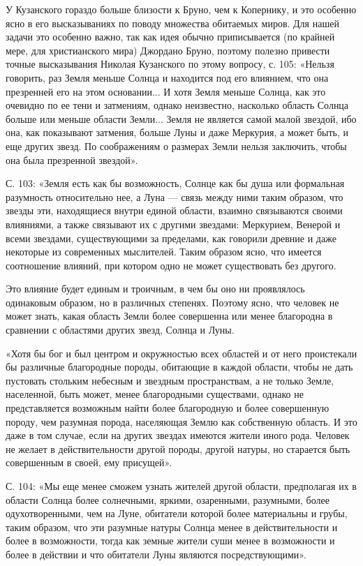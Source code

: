 У Кузанского гораздо  больше близости к Бруно, чем к  Копернику, и это
особенно  ясно  в  его  высказываниях по  поводу  множества  обитаемых
миров.  Для нашей  задачи  это  особенно важно,  так  как идея  обычно
приписывается  (по  крайней  мере, для  христианского  мира)  Джордано
Бруно, поэтому полезно привести точные высказывания Николая Кузанского
по этому  вопросу, с. 105:  «Нельзя говорить, раз Земля  меньше Солнца
и  находится  под  его  влиянием,  что  она  презренней  его  на  этом
основании... И хотя Земля меньше Солнца, как это очевидно по ее тени и
затмениям,  однако неизвестно,  насколько  область  Солнца больше  или
меньше области  Земли... Земля  не является  самой малой  звездой, ибо
она, как  показывают затмения,  больше Луны и  даже Меркурия,  а может
быть,  и еще  других звезд.  По соображениям  о размерах  Земли нельзя
заключить, чтобы она была презренной звездой».

С.  103: «Земля  есть  как  бы возможность,  Солнце  как  бы душа  или
формальная разумность  относительно нее, а  Луна --- связь  между ними
таким  образом, что  звезды  эти, находящиеся  внутри единой  области,
взаимно связываются своими  влияниями, а также связывают  их с другими
звездами:  Меркурием,  Венерой  и  всеми  звездами,  существующими  за
пределами,  как  говорили  древние  и даже  некоторые  из  современных
мыслителей. Таким  образом ясно, что имеется  соотношение влияний, при
котором одно не может существовать без другого.

Это  влияние будет  единым и  троичным, в  чем бы  оно ни  проявлялось
одинаковым образом, но в различных степенях. Поэтому ясно, что человек
не  может  знать,  какая  область Земли  более  совершенна  или  менее
благородна в сравнении с областями других звезд, Солнца и Луны.

«Хотя  бы бог  и был  центром и  окружностью всех  областей и  от него
проистекали  бы  различные  благородные  породы,  обитающие  в  каждой
области,  чтобы  не  дать   пустовать  стольким  небесным  и  звездным
пространствам,  а  не  только  Земле, населенной,  быть  может,  менее
благородными  существами,  однако  не представляется  возможным  найти
более  благородную и  более совершенную  породу, чем  разумная порода,
населяющая Землю  как собственную  область. И это  даже в  том случае,
если на других звездах имеются жители  иного рода. Человек не желает в
действительности  другой  породы,  другой натуры,  но  старается  быть
совершенным в своей, ему присущей».

С.  104:  «Мы   еще  менее  сможем  узнать   жителей  другой  области,
предполагая их в области  Солнца более солнечными, яркими, озаренными,
разумными, более одухотворенными, чем на Луне, обитатели которой более
материальны и  грубы, таким  образом, что  эти разумные  натуры Солнца
менее  в действительности  и  более в  возможности,  тогда как  земные
жители суши  менее в возможности  и более  в действии и  что обитатели
Луны являются посредствующими».

